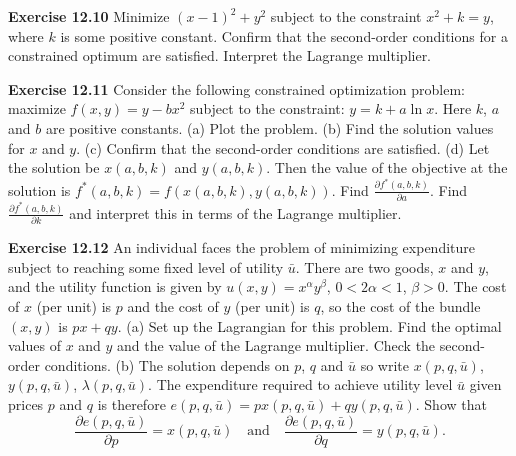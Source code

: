 \begin{original}
\textbf{Exercise 12.10} Minimize $(x - 1)^2 + y^2$ subject to the constraint $x^2 + k = y$, where $k$ is some positive constant. Confirm that the second-order conditions for a constrained optimum are satisfied. Interpret the Lagrange multiplier.

\textbf{Exercise 12.11} Consider the following constrained optimization problem: maximize $f(x, y) = y - bx^2$ subject to the constraint: $y = k + a\ln x$. Here $k$, $a$ and $b$ are positive constants.
(a) Plot the problem.
(b) Find the solution values for $x$ and $y$.
(c) Confirm that the second-order conditions are satisfied.
(d) Let the solution be $x(a, b, k)$ and $y(a, b, k)$. Then the value of the objective at the solution is $f^*(a, b, k) = f(x(a, b, k), y(a, b, k))$. Find $\frac{\partial f^*(a,b,k)}{\partial a}$. Find $\frac{\partial f^*(a,b,k)}{\partial k}$ and interpret this in terms of the Lagrange multiplier.

\textbf{Exercise 12.12} An individual faces the problem of minimizing expenditure subject to reaching some fixed level of utility $\bar{u}$. There are two goods, $x$ and $y$, and the utility function is given by $u(x, y) = x^\alpha y^\beta$, $0 < 2\alpha < 1$, $\beta > 0$. The cost of $x$ (per unit) is $p$ and the cost of $y$ (per unit) is $q$, so the cost of the bundle $(x, y)$ is $px + qy$.
(a) Set up the Lagrangian for this problem. Find the optimal values of $x$ and $y$ and the value of the Lagrange multiplier. Check the second-order conditions.
(b) The solution depends on $p$, $q$ and $\bar{u}$ so write $x(p, q, \bar{u})$, $y(p, q, \bar{u})$, $\lambda(p, q, \bar{u})$. The expenditure required to achieve utility level $\bar{u}$ given prices $p$ and $q$ is therefore $e(p, q, \bar{u}) = p x(p, q, \bar{u}) + q y(p, q, \bar{u})$. Show that
\[
\frac{\partial e(p, q, \bar{u})}{\partial p} = x(p, q, \bar{u}) \quad\text{and}\quad \frac{\partial e(p, q, \bar{u})}{\partial q} = y(p, q, \bar{u}).
\]
\end{original}
